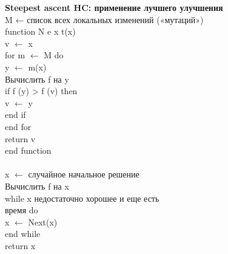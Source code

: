 \textbf{Steepest ascent HC: применение лучшего улучшения}\\
M ← список всех локальных изменений («мутаций»)
\\
function N e x t(x)  \\
\tab v $\leftarrow$ x   \\
\tab for m $\leftarrow$ M do  \\
\tab \tab y $\leftarrow$ m(x)  \\
\tab \tab Вычислить f на y \\ 
\tab \tab if f (y) > f (v) then \\  
\tab \tab \tab v $\leftarrow$ y \\  
\tab \tab end if \\ 
\tab end for \\ 
\tab return v \\ 
end function \\ 
\\
x $\leftarrow$ случайное начальное решение  \\
Вычислить f на x  \\
while x недостаточно хорошее и еще есть  \\
время do  \\
\tab x $\leftarrow$ Next(x)\\
end while   \\
return x\\ 

